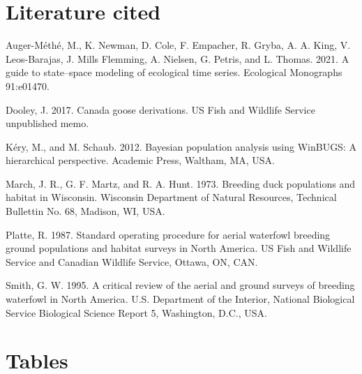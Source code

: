 \documentclass[
  12pt,
]{article}
\newlength{\cslhangindent}
\newlength{\cslentryspacingunit} %
\newenvironment{CSLReferences}[2] %
 {%
  \setlength{\parindent}{0pt}
  \ifodd #1
  \let\oldpar\par
  \def\par{\hangindent=\cslhangindent\oldpar}
  \fi
  \setlength{\parskip}{#2\cslentryspacingunit}
 }%
 {}
\begin{document}
\newpage

\hypertarget{literature-cited}{%
\section{Literature cited}\label{literature-cited}}

\hypertarget{refs}{}
\begin{CSLReferences}{1}{0}
\leavevmode{}%
Auger-Méthé, M., K. Newman, D. Cole, F. Empacher, R. Gryba, A. A. King,
V. Leos-Barajas, J. Mills Flemming, A. Nielsen, G. Petris, and L.
Thomas. 2021. A guide to state--space modeling of ecological time
series. Ecological Monographs 91:e01470.

\leavevmode{}%
Dooley, J. 2017. Canada goose derivations. US Fish and Wildlife Service
unpublished memo.

\leavevmode{}%
Kéry, M., and M. Schaub. 2012. Bayesian population analysis using
WinBUGS: A hierarchical perspective. Academic Press, Waltham, MA, USA.

\leavevmode{}%
March, J. R., G. F. Martz, and R. A. Hunt. 1973. Breeding duck
populations and habitat in {Wisconsin}. Wisconsin Department of Natural
Resources, Technical Bullettin No. 68, Madison, WI, USA.

\leavevmode{}%
Platte, R. 1987. Standard operating procedure for aerial waterfowl
breeding ground populations and habitat surveys in {North America}. US
Fish and Wildlife Service and Canadian Wildlife Service, Ottawa, ON,
CAN.

\leavevmode{}%
Smith, G. W. 1995. A critical review of the aerial and ground surveys of
breeding waterfowl in {North America}. U.S. Department of the Interior,
National Biological Service Biological Science Report 5, Washington,
D.C., USA.

\end{CSLReferences}

\newpage

\hypertarget{tables}{%
\section{Tables}\label{tables}}
\end{document}
